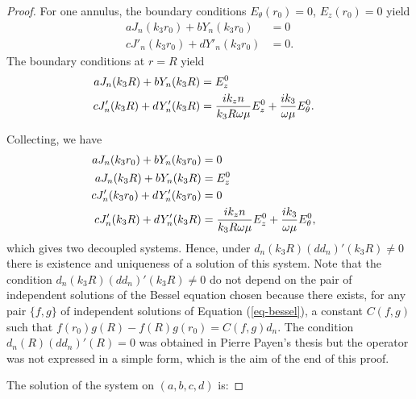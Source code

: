 \begin{proof}
            For one annulus, the boundary conditions  $E_{\theta}(r_0)=0$, $E_z(r_0)=0$ yield
            \begin{align*}
                a J_n(k_3r_0)+bY_n(k_3r_0)&=0
                \\
                cJ'_n(k_3r_0)+dY'_n(k_3r_0)&=0.
            \end{align*}
            The boundary conditions at $r=R$ yield
            \begin{align*}
                aJ_n(k_3R)+bY_n(k_3R) &= E_z^0
                \cr
                cJ'_n(k_3R)+dY'_n(k_3R) &= \frac{ik_zn}{k_3R\omega \mu}E^0_z+\frac{ik_3}{\omega \mu}E_{\theta}^0.
            \end{align*}

            Collecting, we have
            \begin{align*}
                a J_n(k_3r_0)+bY_n(k_3r_0)&=0
                \cr
                aJ_n(k_3R)+bY_n(k_3R)&= E_z^0
                \cr
                cJ'_n(k_3r_0)+dY'_n(k_3r_0)&=0
                \cr
                cJ'_n(k_3R)+dY'_n(k_3R)&= \frac{ik_zn}{k_3R\omega \mu}E^0_z+\frac{ik_3}{\omega \mu}E_{\theta}^0,
            \end{align*}
            which gives two decoupled systems.
            Hence, under $d_n(k_3R)(dd_n)'(k_3R)\not=0$ there is existence and uniqueness of a solution of this system.
            Note that the condition $d_n(k_3R)(dd_n)'(k_3R)\not=0$ do not depend on the pair of independent solutions of the Bessel equation chosen because there exists, for any pair $\{f,g\}$ of independent solutions of Equation (\ref{eq-bessel}), a constant $C(f,g)$ such that $f(r_0)g(R)-f(R)g(r_0)=C(f,g)d_n$.
            The condition $d_n(R)(dd_n)'(R)=0$ was obtained in Pierre Payen's thesis but the operator was not expressed in a simple form, which is the aim of the end of this proof.


            The solution of the system on $(a,b,c,d)$ is:


\end{proof}
